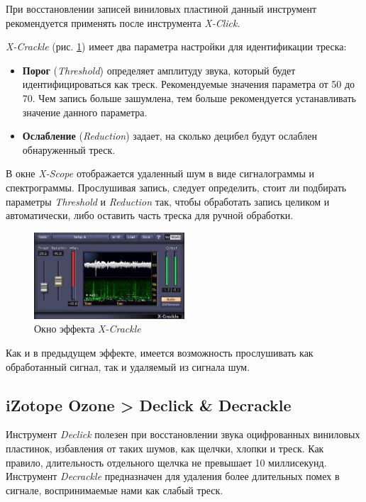 \documentclass[oneside, final, 14pt]{extreport}
\begin{document}
При восстановлении записей виниловых пластиной данный инструмент рекомендуется применять после инструмента \emph{X-Click}.

\emph{X-Crackle} (рис. \ref{pic-crackle-01}) имеет два параметра настройки для идентификации треска:
\begin{itemize}
  \item \textbf{Порог} (\emph{Threshold}) определяет амплитуду звука, который будет идентифицироваться как треск. Рекомендуемые значения параметра от 50 до 70. Чем запись больше зашумлена, тем больше рекомендуется устанавливать значение данного параметра.
  \item \textbf{Ослабление} (\emph{Reduction}) задает, на сколько децибел будут ослаблен обнаруженный треск.
\end{itemize}

В окне \emph{X-Scope} отображается удаленный шум в виде сигналограммы и спектрограммы. Прослушивая запись, следует определить, стоит ли подбирать параметры \emph{Threshold} и \emph{Reduction} так, чтобы обработать запись целиком и автоматически, либо оставить часть треска для ручной обработки.

\begin{figure}[h]
\centering
\includegraphics[width=0.5\textwidth]{pic-crackle-01}
\caption{Окно эффекта \textit{X-Crackle}}
\label{pic-crackle-01}
\end{figure}

Как и в предыдущем эффекте, имеется возможность прослушивать как обработанный сигнал, так и удаляемый из сигнала шум.

\subsection{iZotope Ozone > Declick \& Decrackle}

Инструмент \emph{Declick} полезен при восстановлении звука оцифрованных виниловых пластинок, избавления от таких шумов, как щелчки, хлопки и треск. Как правило, длительность отдельного щелчка не превышает 10 миллисекунд. Инструмент \emph{Decrackle} предназначен для удаления более длительных помех в сигнале, воспринимаемые нами как слабый треск.
\end{document}
